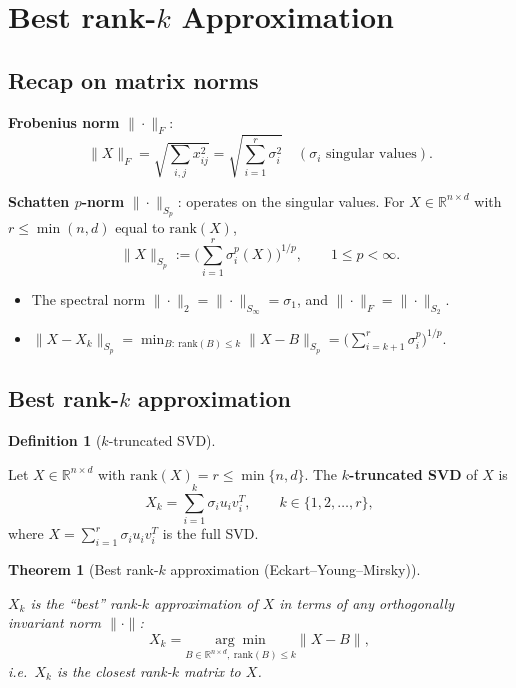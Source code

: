 \documentclass[
  letterpaper,
  DIV=11,
  numbers=noendperiod]{scrreprt}
\providecommand{\tightlist}{%
  \setlength{\itemsep}{0pt}\setlength{\parskip}{0pt}}
\theoremstyle{definition}
\newtheorem{definition}{Definition}[chapter]
\theoremstyle{plain}
\newtheorem{theorem}{Theorem}[chapter]
\theoremstyle{plain}
\theoremstyle{definition}
\theoremstyle{plain}
\theoremstyle{plain}
\theoremstyle{remark}
\begin{document}
\section{\texorpdfstring{Best rank-\(k\)
Approximation}{Best rank-k Approximation}}\label{best-rank-k-approximation}

\subsection{Recap on matrix norms}\label{recap-on-matrix-norms}

\textbf{Frobenius norm} \(\|\cdot\|_F\): \[
\|X\|_F = \sqrt{\sum_{i,j} x_{ij}^2} = \sqrt{\sum_{i=1}^{r} \sigma_i^2}
\quad (\sigma_i \text{ singular values}).
\]

\textbf{Schatten \(p\)-norm} \(\|\cdot\|_{S_p}\): operates on the
singular values. For \(X \in \mathbb{R}^{n \times d}\) with
\(r \le \min(n,d)\) equal to \(\mathrm{rank}(X)\), \[
\|X\|_{S_p} := \Big(\sum_{i=1}^{r} \sigma_i^p(X)\Big)^{1/p}, \qquad 1 \le p < \infty .
\]

\begin{itemize}
\tightlist
\item
  The spectral norm \(\|\cdot\|_2 = \|\cdot\|_{S_\infty} = \sigma_1\),
  and \(\|\cdot\|_F = \|\cdot\|_{S_2}\).
\item
  \(\displaystyle \|X - X_k\|_{S_p} = \min_{B:\ \mathrm{rank}(B) \le k} \|X - B\|_{S_p} = \Big(\sum_{i=k+1}^{r} \sigma_i^p\Big)^{1/p}\).
\end{itemize}

\subsection{\texorpdfstring{Best rank-\(k\)
approximation}{Best rank-k approximation}}\label{best-rank-k-approximation-1}

\begin{definition}[\(k\)-truncated
SVD]\protect\hypertarget{def-truncated-svd}{}\label{def-truncated-svd}

Let \(X \in \mathbb{R}^{n \times d}\) with
\(\mathrm{rank}(X) = r \le \min\{n, d\}\). The \textbf{\(k\)-truncated
SVD} of \(X\) is \[
X_k = \sum_{i=1}^{k} \sigma_i u_i v_i^T, \qquad k \in \{1, 2, \dots, r\},
\] where \(X = \sum_{i=1}^{r} \sigma_i u_i v_i^T\) is the full SVD.

\end{definition}

\begin{theorem}[Best rank-\(k\) approximation
(Eckart--Young--Mirsky)]\protect\hypertarget{thm-eckart-young}{}\label{thm-eckart-young}

\(X_k\) is the ``best'' rank-\(k\) approximation of \(X\) in terms of
any orthogonally invariant norm \(\|\cdot\|\): \[
X_k = \underset{B \in \mathbb{R}^{n \times d},\ \mathrm{rank}(B) \le k}{\arg\min} \|X - B\| ,
\] i.e.~\(X_k\) is the closest rank-\(k\) matrix to \(X\).

\end{theorem}
\end{document}
